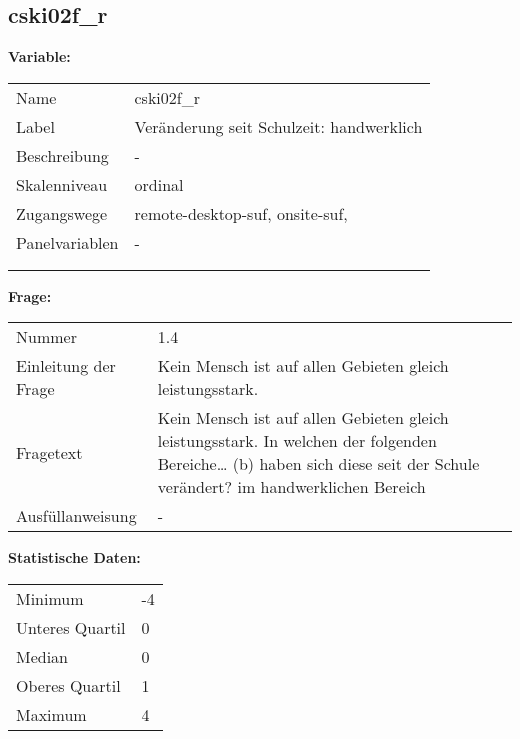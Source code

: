 	
	
	\subsection{cski02f\_r}
	\label{subSection:cski02f_r}

	\noindent\textbf{Variable:}\\
		\begin{tabular}{lL{11.3cm}}
			\label{tableVariable:cski02f_r}
			Name & cski02f\_r \\
			Label & Veränderung seit Schulzeit: handwerklich \\
			Beschreibung & - \\
			Skalenniveau & ordinal \\
			Zugangswege &
				remote-desktop-suf,
				onsite-suf,
 \\
			Panelvariablen & -
			 \\
			 \\
 \\
		\end{tabular}

		\vspace*{1 cm}
		\noindent\textbf{Frage:}\\
		\begin{tabular}{lL{11.3cm}}
			\label{tableQuestion:cski02f_r}
			Nummer & 1.4 \\
			Einleitung der Frage & Kein Mensch ist auf allen Gebieten gleich leistungsstark. \\
			Fragetext & Kein Mensch ist auf allen Gebieten gleich leistungsstark. In welchen der folgenden Bereiche…
(b) haben sich diese seit der Schule verändert?
im handwerklichen Bereich \\
			Ausfüllanweisung & - \\
		\end{tabular}


		\vspace*{1 cm}
		\noindent\textbf{Statistische Daten:}\\
			\begin{tabular}{ll}
				\label{tableStatistics:cski02f_r}
					Minimum & -4 \\
					Unteres Quartil & 0 \\
					Median & 0 \\
					Oberes Quartil & 1 \\
					Maximum & 4 \\
			\end{tabular}



